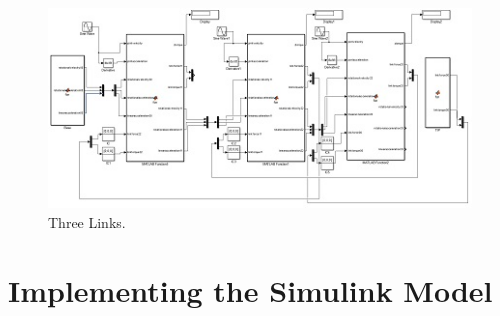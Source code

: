 \begin{figure}[htsb]
  \centering
  \includegraphics{figures/Three Links.jpg}
  \caption{Three Links.}
\end{figure}


\section{Implementing the Simulink Model}


